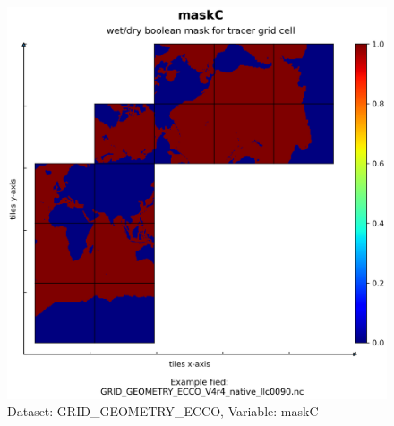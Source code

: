 \begin{figure}[H]
\centering
\includegraphics[scale=0.55]{../images/plots/native_plots_coords/Geometry_Parameters_for_the_Lat-Lon-Cap_90_(llc90)_Native_Model_Grid_(Version_4_Release_4)/maskC.png}
\caption{Dataset: GRID\_GEOMETRY\_ECCO, Variable: maskC}
\label{tab:table-GRID_GEOMETRY_ECCO_maskC-Plot}
\end{figure}
\pagebreak

